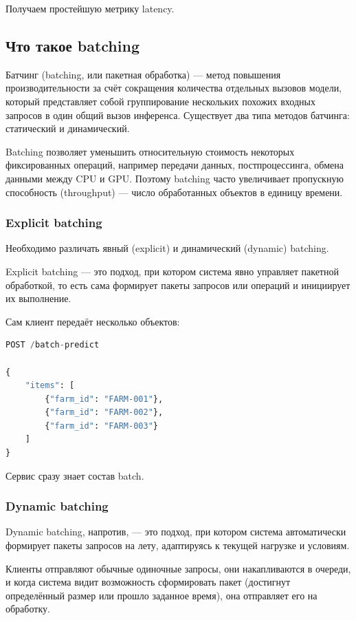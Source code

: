 \documentclass[12pt,a4paper]{article}
\begin{document}
Получаем простейшую метрику latency.

\subsection{Что такое batching}

Батчинг (batching, или пакетная обработка) — метод повышения производительности за счёт сокращения количества отдельных вызовов модели, который представляет собой группирование нескольких похожих входных запросов в один общий вызов инференса. Существует два типа методов батчинга: статический и динамический.

Batching позволяет уменьшить относительную стоимость некоторых фиксированных операций, например передачи данных, постпроцессинга, обмена данными между CPU и GPU. Поэтому batching часто увеличивает пропускную способность (throughput) — число обработанных объектов в единицу времени.

\subsubsection{Explicit batching}

Необходимо различать явный (explicit) и динамический (dynamic) batching.

Explicit batching — это подход, при котором система явно управляет пакетной обработкой, то есть сама формирует пакеты запросов или операций и инициирует их выполнение.

Сам клиент передаёт несколько объектов:

\begin{lstlisting}[caption={Explicit batch-запрос}, language=Python]
POST /batch-predict

{
    "items": [
        {"farm_id": "FARM-001"},
        {"farm_id": "FARM-002"},
        {"farm_id": "FARM-003"}
    ]
}
\end{lstlisting}

Сервис сразу знает состав batch.

\subsubsection{Dynamic batching}

Dynamic batching, напротив, — это подход, при котором система автоматически формирует пакеты запросов на лету, адаптируясь к текущей нагрузке и условиям.

Клиенты отправляют обычные одиночные запросы, они накапливаются в очереди, и когда система видит возможность сформировать пакет (достигнут определённый размер или прошло заданное время), она отправляет его на обработку.
\end{document}
